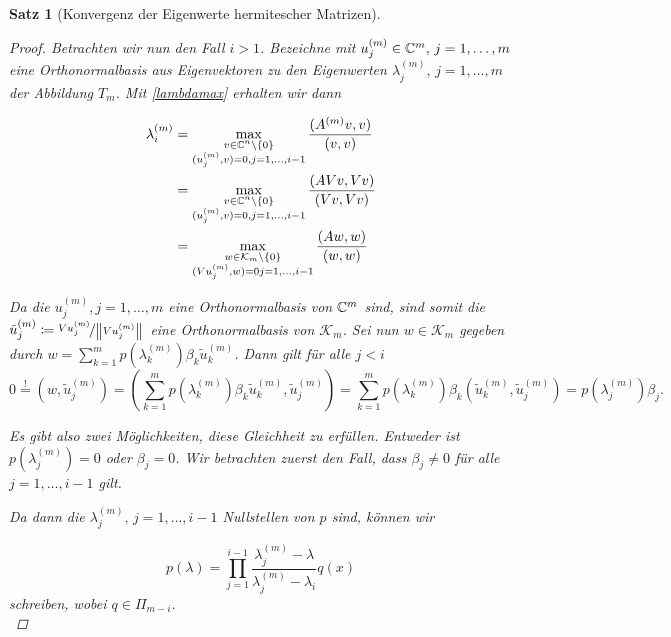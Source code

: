 \documentclass{article}
\theoremstyle{plain}
\newtheorem{theorem}    {Satz}   [section]
\begin{document}
\begin{theorem}[Konvergenz der Eigenwerte hermitescher Matrizen]
\begin{proof}
	Betrachten wir nun den Fall $i>1$.
	Bezeichne mit $u_j^{(m)} \in \mathbb{C}^m, \, j = 1,\dots, m$ eine Orthonormalbasis aus Eigenvektoren zu den Eigenwerten $\lambda_j^{(m)} , \, j = 1,\dots, m$ der Abbildung $T_m$. Mit \eqref{lambdamax} erhalten wir dann

	\begin{equation}
		\begin{aligned}
			\label{Darstellung EW}
			\lambda_i^{(m)} &= \max_{\substack{v\in \mathbb{C}^n\setminus \{0\} \\ (u_j^{(m)},v) = 0, j = 1,\dots,i-1}} \frac{(A^{(m)}v,v)}{(v,v)} \\
			&= \max_{\substack{v\in \mathbb{C}^n\setminus \{0\} \\ (u_j^{(m)},v) = 0, j = 1,\dots,i-1}} \frac{(AVv,Vv)}{(Vv,Vv)}\\
			&= \max_{\substack{w\in \mathcal{K}_m\setminus \{0\} \\ (Vu_j^{(m)},w) = 0 j = 1,\dots,i-1}} \frac{(Aw,w)}{(w,w)}
		\end{aligned}
	\end{equation}

	Da die $u_j^{(m)}, j = 1,\dots,m$ eine Orthonormalbasis von $\mathbb{C}^m$ sind, sind somit die $\tilde{u}_j^{(m)} \coloneqq \nicefrac{Vu_j^{(m)}}{{\left \| Vu_j^{(m)} \right \|}_{}}$ eine Orthonormalbasis von $\mathcal{K}_m$. Sei nun $w\in \mathcal{K}_m$ gegeben durch $w = \sum_{k=1}^{m} p(\lambda_k^{(m)}) \beta_k \tilde{u}_k^{(m)}$. Dann gilt für alle $j < i$
	\begin{equation*}
		0 \stackrel{!}{=} (w,\tilde{u}_j^{(m)}) = (\sum_{k=1}^{m} p(\lambda_k^{(m)}) \beta_k \tilde{u}_k^{(m)},\tilde{u}_j^{(m)}) = \sum_{k=1}^{m} p(\lambda_k^{(m)}) \beta_k (\tilde{u}_k^{(m)},\tilde{u}_j^{(m)}) = p(\lambda_j^{(m)}) \beta_j.
	\end{equation*}

	Es gibt also zwei Möglichkeiten, diese Gleichheit zu erfüllen. Entweder ist $p(\lambda_j^{(m)}) = 0$ oder $\beta_j = 0$. Wir betrachten zuerst den Fall, dass  $\beta_j \neq 0$ für alle $j = 1,\dots, i-1$ gilt.

	Da dann die $\lambda_j^{(m)}, \, j = 1,\dots,i-1$ Nullstellen von $p$ sind, können wir

	\begin{equation*}
		p(\lambda) = \prod_{j = 1}^{i-1} \frac{\lambda_j^{(m)} -\lambda}{\lambda_j^{(m)} - \lambda_i} q(x)
	\end{equation*}
	schreiben, wobei $q \in \Pi_{m-i}$.\\


\end{proof}
\end{theorem}
\end{document}
